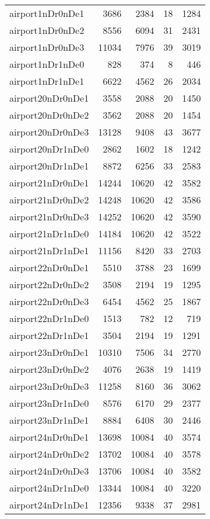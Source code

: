 \begin{longtable}{lrrrr}
airport1nDr0nDe1 & 3686 & 2384 & 18 & 1284 \\
airport1nDr0nDe2 & 8556 & 6094 & 31 & 2431 \\
airport1nDr0nDe3 & 11034 & 7976 & 39 & 3019 \\
airport1nDr1nDe0 & 828 & 374 & 8 & 446 \\
airport1nDr1nDe1 & 6622 & 4562 & 26 & 2034 \\
airport20nDr0nDe1 & 3558 & 2088 & 20 & 1450 \\
airport20nDr0nDe2 & 3562 & 2088 & 20 & 1454 \\
airport20nDr0nDe3 & 13128 & 9408 & 43 & 3677 \\
airport20nDr1nDe0 & 2862 & 1602 & 18 & 1242 \\
airport20nDr1nDe1 & 8872 & 6256 & 33 & 2583 \\
airport21nDr0nDe1 & 14244 & 10620 & 42 & 3582 \\
airport21nDr0nDe2 & 14248 & 10620 & 42 & 3586 \\
airport21nDr0nDe3 & 14252 & 10620 & 42 & 3590 \\
airport21nDr1nDe0 & 14184 & 10620 & 42 & 3522 \\
airport21nDr1nDe1 & 11156 & 8420 & 33 & 2703 \\
airport22nDr0nDe1 & 5510 & 3788 & 23 & 1699 \\
airport22nDr0nDe2 & 3508 & 2194 & 19 & 1295 \\
airport22nDr0nDe3 & 6454 & 4562 & 25 & 1867 \\
airport22nDr1nDe0 & 1513 & 782 & 12 & 719 \\
airport22nDr1nDe1 & 3504 & 2194 & 19 & 1291 \\
airport23nDr0nDe1 & 10310 & 7506 & 34 & 2770 \\
airport23nDr0nDe2 & 4076 & 2638 & 19 & 1419 \\
airport23nDr0nDe3 & 11258 & 8160 & 36 & 3062 \\
airport23nDr1nDe0 & 8576 & 6170 & 29 & 2377 \\
airport23nDr1nDe1 & 8884 & 6408 & 30 & 2446 \\
airport24nDr0nDe1 & 13698 & 10084 & 40 & 3574 \\
airport24nDr0nDe2 & 13702 & 10084 & 40 & 3578 \\
airport24nDr0nDe3 & 13706 & 10084 & 40 & 3582 \\
airport24nDr1nDe0 & 13344 & 10084 & 40 & 3220 \\
airport24nDr1nDe1 & 12356 & 9338 & 37 & 2981 \\

\end{longtable}
